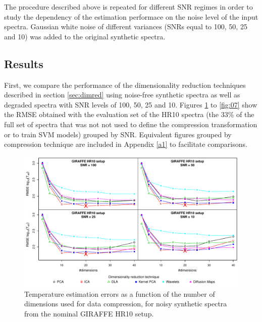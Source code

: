 \documentclass[a4paper,fleqn,usenatbib]{mnras}
\begin{document}
{{{The procedure described above is repeated for different SNR regimes in
order to study the dependency of the estimation performace on the
noise level of the input spectra. Gaussian white noise of different
variances (SNRs equal to 100, 50, 25 and 10) was added to the original
synthetic spectra. 

\subsection{Results}

First, we compare the performance of the dimensionality reduction
techniques described in section \ref{sec:dimred} using noise-free
synthetic spectra as well as degraded spectra with SNR levels of 100,
50, 25 and 10. Figures \ref{fig:02} to \ref{fig:07} show the RMSE
obtained with the evaluation set of the HR10 spectra (the 33\% 
of the full set of spectra that was not not used to define the 
compression transformation or to train SVM models) grouped by SNR. 
Equivalent figures grouped by compression technique are included in 
Appendix \ref{a1} to facilitate comparisons.

\begin{figure}
\centering\includegraphics[width=\textwidth]{flamesHR10_Teff_log_BestSVM_N-RMSE_test.pdf}
\caption{Temperature estimation errors as a function of the number of
  dimensions used for data compression, for noisy synthetic
  spectra from the nominal GIRAFFE HR10 setup.}
\label{fig:02}
\end{figure}

}}}
\end{document}
